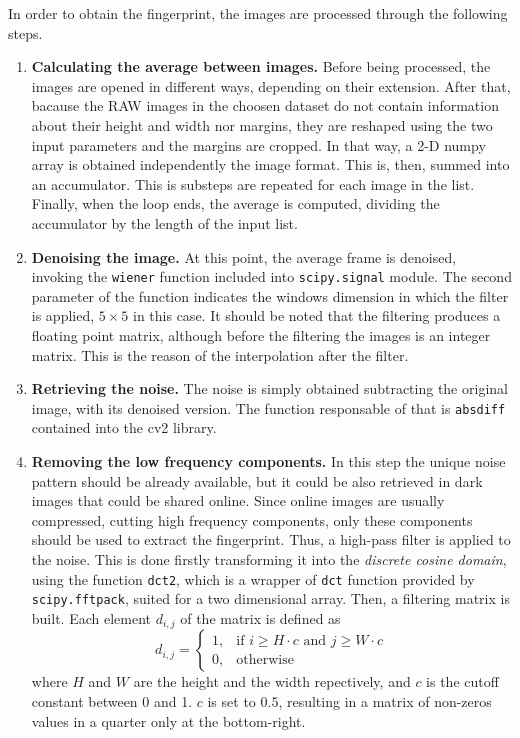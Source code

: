 In order to obtain the fingerprint, the images are processed through the following steps.
\begin{enumerate}
\item \textbf{Calculating the average between images.}
        Before being processed, the images are opened in different ways, depending on their extension. After that, bacause the RAW images in the choosen dataset do not contain information about their height and width nor margins, they are reshaped using the two input parameters and the margins are cropped. In that way, a 2-D numpy array is obtained independently the image format. This is, then, summed into an accumulator. This is substeps are repeated for each image in the list. Finally, when the loop ends, the average is computed, dividing the accumulator by the length of the input list.
\item \textbf{Denoising the image.}
        At this point, the average frame is denoised, invoking the \texttt{wiener} function included into \texttt{scipy.signal} module. The second parameter of the function indicates the windows dimension in which the filter is applied, $5\times5$ in this case. It should be noted that the filtering produces a floating point matrix, although before the filtering the images is an integer matrix. This is the reason of the interpolation after the filter.
\item \textbf{Retrieving the noise.}
        The noise is simply obtained subtracting the original image, with its denoised version. The function responsable of that is \texttt{absdiff} contained into the cv2 library.
\item \textbf{Removing the low frequency components.}
        In this step the unique noise pattern should be already available, but it could be also retrieved in dark images that could be shared online. Since online images are usually compressed, cutting high frequency components, only these components should be used to extract the fingerprint. Thus, a high-pass filter is applied to the noise. This is done firstly transforming it into the \emph{discrete cosine domain}, using the function \texttt{dct2}, which is a wrapper of \texttt{dct} function provided by \texttt{scipy.fftpack}, suited for a two dimensional array. Then, a filtering matrix is built. Each element $d_{i,j}$ of the matrix is defined as
        \begin{equation}
          d_{i,j} = \begin{cases} 1, & \mbox{if } i \geq H \cdot c \mbox{ and } j \geq W \cdot c\\ 0, & \mbox{otherwise} \end{cases}
        \end{equation}
        where $H$ and  $W$ are the height and the width repectively, and $c$ is the cutoff constant between 0 and 1.
        $c$ is set to $0.5$, resulting in a matrix of non-zeros values in a quarter only at the bottom-right.


\end{enumerate}
